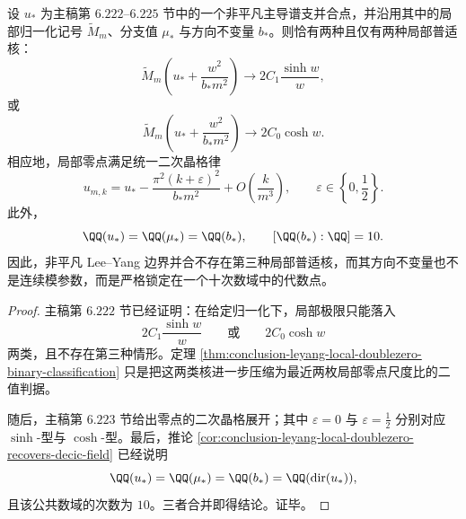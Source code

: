 \begin{theorem}\label{thm:conclusion-leyang-boundary-coalescence-binary-kernel-decic-rigidity}
设 \(u_\ast\) 为主稿第 \(6.222\)–\(6.225\) 节中的一个非平凡主导谱支并合点，并沿用其中的局部归一化记号 \(\widetilde M_m\)、分支值 \(\mu_\ast\) 与方向不变量 \(b_\ast\)。则恰有两种且仅有两种局部普适核：
\[
\widetilde M_m\!\left(u_\ast+\frac{w^2}{b_\ast m^2}\right)
\longrightarrow
2C_1\frac{\sinh w}{w},
\]
或
\[
\widetilde M_m\!\left(u_\ast+\frac{w^2}{b_\ast m^2}\right)
\longrightarrow
2C_0\cosh w.
\]
相应地，局部零点满足统一二次晶格律
\[
u_{m,k}
=
u_\ast-\frac{\pi^2(k+\varepsilon)^2}{b_\ast m^2}
+O\!\left(\frac{k}{m^3}\right),
\qquad
\varepsilon\in\left\{0,\frac12\right\}.
\]
此外，
\[
\QQ(u_\ast)=\QQ(\mu_\ast)=\QQ(b_\ast),
\qquad
[\QQ(b_\ast):\QQ]=10.
\]
因此，非平凡 Lee--Yang 边界并合不存在第三种局部普适核，而其方向不变量也不是连续模参数，而是严格锁定在一个十次数域中的代数点。
\end{theorem}
\begin{proof}
主稿第 \(6.222\) 节已经证明：在给定归一化下，局部极限只能落入
\[
2C_1\frac{\sinh w}{w}
\qquad\text{或}\qquad
2C_0\cosh w
\]
两类，且不存在第三种情形。定理 \ref{thm:conclusion-leyang-local-doublezero-binary-classification} 只是把这两类核进一步压缩为最近两枚局部零点尺度比的二值判据。

随后，主稿第 \(6.223\) 节给出零点的二次晶格展开；其中 \(\varepsilon=0\) 与 \(\varepsilon=\tfrac12\) 分别对应 \(\sinh\)-型与 \(\cosh\)-型。最后，推论 \ref{cor:conclusion-leyang-local-doublezero-recovers-decic-field} 已经说明
\[
\QQ(u_\ast)=\QQ(\mu_\ast)=\QQ(b_\ast)=\QQ(\operatorname{dir}(u_\ast)),
\]
且该公共数域的次数为 \(10\)。三者合并即得结论。证毕。
\end{proof}
